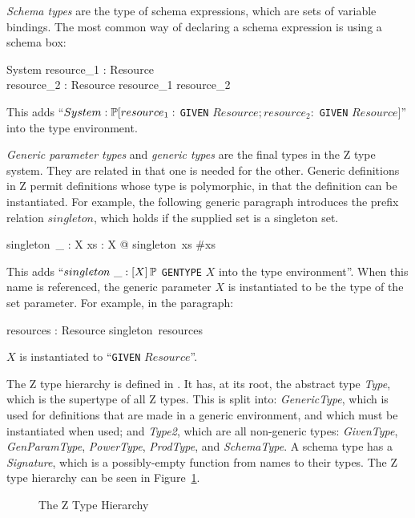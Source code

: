 {\em Schema types} are the type of schema expressions, which are sets
of variable bindings. The most common way of declaring a schema
expression is using a schema box:
\begin{schema}{System}
  resource_1 : Resource\\
  resource_2 : Resource
\where
  resource_1 \neq resource_2
\end{schema}

This adds ``$System
: \power [resource_1 : $ {\tt GIVEN} $Resource; resource_2 : $ {\tt GIVEN}
$Resource]$'' into the type environment.

{\em Generic parameter types} and {\em generic types} are the final
types in the Z type system. They are related in that one is needed for
the other. Generic definitions in Z permit definitions whose type is
polymorphic, in that the definition can be instantiated. For example,
the following generic paragraph introduces the prefix relation
$singleton$, which holds if the supplied set is a singleton set.
\begin{gendef}[X]
  singleton~\_ : \power X
\where
  \forall xs : \power X @ singleton~xs \iff \#xs 
\end{gendef}

This adds ``$singleton~\_ : [X] \power $ {\tt GENTYPE} $X$ into the
type environment''. When this name is referenced, the generic
parameter $X$ is instantiated to be the type of the set parameter. For
example, in the paragraph:
\begin{axdef}
  resources : \power Resource
\where
  singleton~resources
\end{axdef}

$X$ is instantiated to ``{\tt GIVEN} $Resource$''.

The Z type hierarchy is defined in . It has, at its root,
the abstract type {\em Type}, which is the supertype of all Z
types. This is split into: {\em GenericType}, which is used for
definitions that are made in a generic environment, and which must be
instantiated when used; and {\em Type2}, which are all non-generic
types: {\em GivenType}, {\em GenParamType}, {\em PowerType}, {\em
ProdType}, and {\em SchemaType}. A schema type has a {\em Signature},
which is a possibly-empty function from names to their types. The Z
type hierarchy can be seen in Figure~\ref{z-types}.

\def\epsfsize#1#2{0.85#1}
\begin{figure}
\begin{center}
\end{center}
\caption{The Z Type Hierarchy}
\label{z-types}
\end{figure}
\def\epsfsize#1#2{\epsfxsize}

